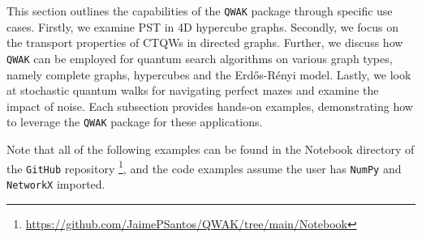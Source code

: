 \documentclass[../../dissertation.tex]{subfiles}
\begin{document}
This section outlines the capabilities of the \texttt{QWAK} package through
specific use cases. Firstly, we examine PST in 4D hypercube graphs. Secondly,
we focus on the transport properties of CTQWs in directed graphs. Further, we
discuss how \texttt{QWAK} can be employed for quantum search algorithms on
various graph types, namely complete graphs, hypercubes and the Erdős-Rényi
model. Lastly, we look at stochastic quantum walks for navigating perfect mazes
and examine the impact of noise. Each subsection provides hands-on examples,
demonstrating how to leverage the \texttt{QWAK} package for these
applications.\par

Note that all of the following examples can be found in the Notebook directory
of the \texttt{GitHub} repository
\footnote{\url{https://github.com/JaimePSantos/QWAK/tree/main/Notebook}}, and the
code examples assume the user has \texttt{NumPy} and \texttt{NetworkX}
imported.
\end{document}

